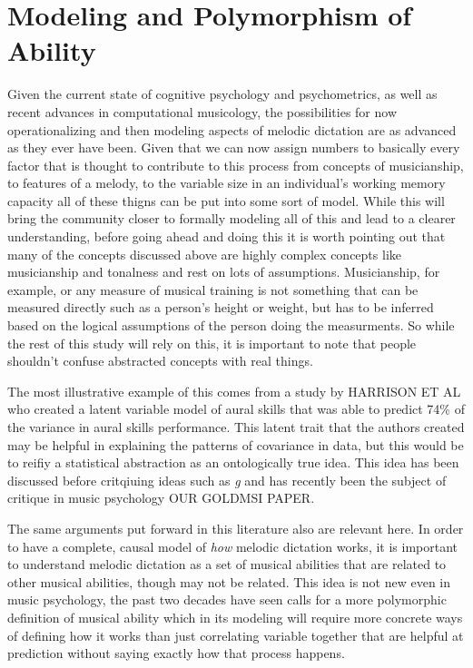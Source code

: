 \documentclass[]{book}
\begin{document}
\hypertarget{modeling-and-polymorphism-of-ability}{%
\section{Modeling and Polymorphism of Ability}\label{modeling-and-polymorphism-of-ability}}

Given the current state of cognitive psychology and psychometrics, as well as recent advances in computational musicology, the possibilities for now operationalizing and then modeling aspects of melodic dictation are as advanced as they ever have been.
Given that we can now assign numbers to basically every factor that is thought to contribute to this process from concepts of musicianship, to features of a melody, to the variable size in an individual's working memory capacity all of these thigns can be put into some sort of model.
While this will bring the community closer to formally modeling all of this and lead to a clearer understanding, before going ahead and doing this it is worth pointing out that many of the concepts discussed above are highly complex concepts like musicianship and tonalness and rest on lots of assumptions.
Musicianship, for example, or any measure of musical training is not something that can be measured directly such as a person's height or weight, but has to be inferred based on the logical assumptions of the person doing the measurments.
So while the rest of this study will rely on this, it is important to note that people shouldn't confuse abstracted concepts with real things.

The most illustrative example of this comes from a study by HARRISON ET AL who created a latent variable model of aural skills that was able to predict 74\% of the variance in aural skills performance.
This latent trait that the authors created may be helpful in explaining the patterns of covariance in data, but this would be to reifiy a statistical abstraction as an ontologically true idea.
This idea has been discussed before critqiuing ideas such as \emph{g} \citep{gouldMismeasureMan1996, kovacsProcessOverlapTheory2016} and has recently been the subject of critique in music psychology OUR GOLDMSI PAPER.

The same arguments put forward in this literature also are relevant here.
In order to have a complete, causal model of \emph{how} melodic dictation works, it is important to understand melodic dictation as a set of musical abilities that are related to other musical abilities, though may not be related.
This idea is not new even in music psychology, the past two decades have seen calls for a more polymorphic definition of musical ability \citep{levitinWhatDoesIt2012, peretzModularityMusicProcessing2003} which in its modeling will require more concrete ways of defining how it works than just correlating variable together that are helpful at prediction without saying exactly how that process happens.
\end{document}
